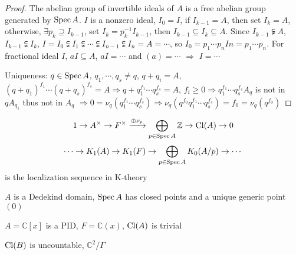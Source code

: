 \documentclass[../main.tex]{subfiles}
\begin{document}
\begin{proof}
The abelian group of invertible ideals of $A$ is a free abelian group generated by $\operatorname{Spec} A$. $I$ is a nonzero ideal, $I_0=I$, if $I_{k-1}=A$, then set $I_k=A$, otherwise, $\exists p_k\supseteq I_{k-1}$, set $I_k=p_k^{-1}I_{k-1}$, then $I_{k-1}\subseteq I_k\subseteq A$. Since $I_{k-1}\subsetneqq A$, $I_{k-1}\subsetneqq I_k$, $I=I_0\subsetneqq I_1\subsetneqq\cdots\subsetneqq I_{n-1}\subsetneqq I_n=A=\cdots$, so $I_0=p_1\cdots p_nIn=p_1\cdots p_n$. For fractional ideal $I$, $aI\subseteq A$, $aI=\cdots$ and $(a)=\cdots$ $\Rightarrow$ $I=\cdots$ \par
Uniqueness: $q\in\operatorname{Spec} A$, $q_1,\cdots,q_s\neq q$, $q+q_i=A$, $(q+q_1)^{f_1}\cdots(q+q_s)^{f_s}=A\Rightarrow q+q_1^{f_1}\cdots q_s^{f_s}=A$, $f_i\geq0\Rightarrow q_1^{f_1}\cdots q_s^{f_s}A_q$ is not in $qA_{q_1}$ thus not in $A_q$ $\Rightarrow 0=\nu_q(q_1^{f_1}\cdots q_s^{f_s})\Rightarrow\nu_q(q^{f_0}q_1^{f_1}\cdots q_s^{f_s})=f_0=\nu_q(q^{f_0})$
\end{proof}

\begin{remark}
\[1\to A^\times\to F^\times\xrightarrow{\oplus\nu_p}\bigoplus_{p\in\operatorname{Spec} A}\mathbb Z\to\operatorname{Cl}(A)\to0\]
\[\cdots\to K_1(A)\to K_1(F)\to\bigoplus_{p\in\operatorname{Spec} A}K_0(A/p)\to\cdots\]
is the localization sequence in K-theory
\end{remark}

\begin{lemma}
$A$ is a Dedekind domain, $\operatorname{Spec} A$ has closed points and a unique generic point $(0)$
\end{lemma}

\begin{example}
$A=\mathbb C[x]$ is a PID, $F=\mathbb C(x)$, $\operatorname{Cl}(A)$ is trivial
\begin{center}
\end{center}
$\operatorname{Cl}(B)$ is uncountable, $\mathbb C^2/\Gamma$
\end{example}
\end{document}
